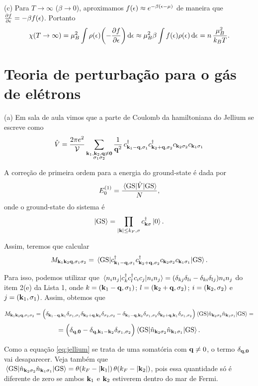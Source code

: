 \documentclass[a4paper,10pt]{article}
\begin{document}
(c) Para $T \to \infty$ ($\beta \to 0$), aproximamos $f(\epsilon) \approx e^{-\beta(\epsilon - \mu)}$ de maneira que $\pdv{f}{\epsilon} = -\beta f(\epsilon)$. Portanto
$$
\chi(T \to \infty) = \mu_B^2 \int \rho(\epsilon) \qty(- \pdv{f}{\epsilon}) \dd{\epsilon} \approx
\mu_B^2 \beta \int f(\epsilon) \rho(\epsilon) \dd{\epsilon} = n \, \frac{\mu_B^2}{k_B T}.
$$


\pagebreak


\section{Teoria de perturbação para o gás de elétrons} \label{sec:pert}

(a) Em sala de aula vimos que a parte de Coulomb da hamiltoniana do Jellium se escreve como
\begin{equation} \label{eq:jellium}
\hat{V} = \frac{2 \pi e^2}{\mathcal{V}}
\sum_{\substack{\vb{k}_1, \vb{k}_2, \vb{q} \neq \vb{0} \\ \sigma_1 \sigma_2}} \frac{1}{\vb{q}^2} \,
c_{\vb{k}_1 - \vb{q}, \sigma_1}^\dagger c_{\vb{k}_2 + \vb{q}, \sigma_2}^\dagger c_{\vb{k}_2 \sigma_2} c_{\vb{k}_1 \sigma_1}
\end{equation}

A correção de primeira ordem para a energia do ground-state é dada por
$$
E_0^{(1)} = \frac{\ev{\hat{V}}{\text{GS}}}{N},
$$
onde o ground-state do sistema é
$$
\ket{\text{GS}} = \prod_{\abs{\vb{k}} \leq k_{F}, \sigma} c_{\vb{k} \sigma}^{\dagger} \ket{0}.
$$

Assim, teremos que calcular
$$
M_{\k_1 \k_2 \q, \s_1 \s_2} = \ev{c_{\k_1 - \q, \s_1}^\d c_{\k_2 + \q, \s_2}^\d c_{\k_2 \s_2} c_{\k_1 \s_1}}{\text{GS}}.
$$

Para isso, podemos utilizar que $\ev{c_k^\d c_l^\d c_i c_j}{n_i n_j} = (\delta_{kj} \delta_{li} - \delta_{ki} \delta_{lj}) n_i n_j$ do item 2(e) da Lista 1, onde $k = (\vb{k}_1 - \vb{q}, \sigma_1)$; $l = (\vb{k}_2 + \vb{q}, \sigma_2)$; $i = (\vb{k}_2, \sigma_2)$ e $j = (\vb{k}_1, \sigma_1)$. Assim, obtemos que

$$
M_{\k_1 \k_2 \q, \s_1 \s_2} =
\Big(
\delta_{\k_1 - \q, \k_1} \delta_{\s_1, \s_1} \delta_{\k_2 + \q, \k_2} \delta_{\s_2, \s_2} -
\delta_{\k_1 - \q, \k_2} \delta_{\s_1, \s_2} \delta_{\k_2 + \q, \k_1} \delta_{\s_1, \s_2}
\Big) \ev{\nn_{\k_2 \s_2} \nn_{\k_1 \s_1}}{\text{GS}} =
$$
$$
=
\Big(
\delta_{\q, \0} -
\delta_{\q, \k_1 - \k_2} \delta_{\s_1, \s_2}
\Big) \ev{\nn_{\k_2 \s_2} \nn_{\k_1 \s_1}}{\text{GS}}.
$$

Como a equação \ref{eq:jellium} se trata de uma somatória com $\vb{q} \neq 0$, o termo $\delta_{\vb{q}, \vb{0}}$ vai desaparecer. Veja também que $\ev{\nn_{\k_2 \s_2} \nn_{\k_1 \s_1}}{\text{GS}} = \theta(k_F - \abs{\k_1}) \, \theta(k_F - \abs{\k_2})$, pois essa quantidade só é diferente de zero se ambos $\vb{k}_1$ e $\vb{k}_2$ estiverem dentro do mar de Fermi.
\end{document}
